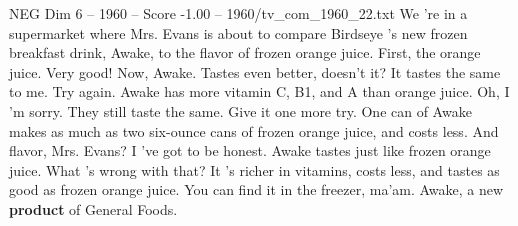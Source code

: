 \begin{textsample}{NEG Dim 6 – 1960 – Score -1.00 – 1960/tv\_com\_1960\_22.txt}  \label{ex:f6_neg_074}
We 're in a supermarket where Mrs.
Evans is about to compare Birdseye 's new frozen breakfast drink, Awake, to the flavor of frozen orange juice.
First, the orange juice.
Very good!
Now, Awake.
Tastes even better, doesn't it?
It tastes the same to me.
Try again.
Awake has more vitamin C, B1, and A than orange juice.
Oh, I 'm sorry.
They still taste the same.
Give it one more try.
One can of Awake makes as much as two six-ounce cans of frozen orange juice, and costs less.
And flavor, Mrs.
Evans?
I 've got to be honest.
Awake tastes just like frozen orange juice.
What 's wrong with that?
It 's richer in vitamins, costs less, and tastes as good as frozen orange juice.
You can find it in the freezer, ma'am.
Awake, a new \textbf{product} of General Foods.

\end{textsample}
